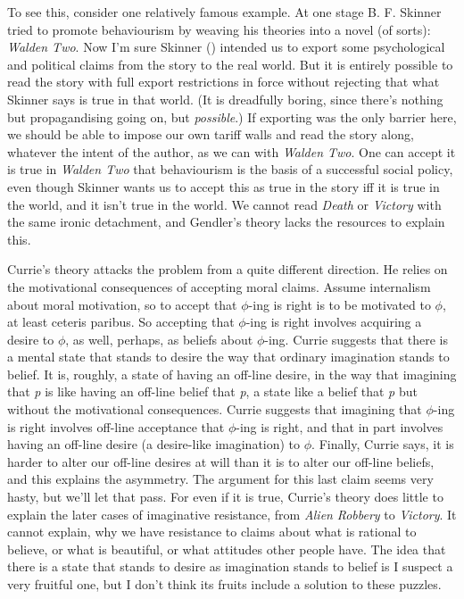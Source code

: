 \documentclass[
  10pt,
  letterpaper,
  DIV=11,
  numbers=noendperiod,
  twoside]{scrartcl}
\begin{document}
To see this, consider one relatively famous example. At one stage B. F.
Skinner tried to promote behaviourism by weaving his theories into a
novel (of sorts): \emph{Walden Two}. Now I'm sure Skinner
() intended us to export some
psychological and political claims from the story to the real world. But
it is entirely possible to read the story with full export restrictions
in force without rejecting that what Skinner says is true in that world.
(It is dreadfully boring, since there's nothing but propagandising going
on, but \emph{possible}.) If exporting was the only barrier here, we
should be able to impose our own tariff walls and read the story along,
whatever the intent of the author, as we can with \emph{Walden Two}. One
can accept it is true in \emph{Walden Two} that behaviourism is the
basis of a successful social policy, even though Skinner wants us to
accept this as true in the story iff it is true in the world, and it
isn't true in the world. We cannot read \emph{Death} or \emph{Victory}
with the same ironic detachment, and Gendler's theory lacks the
resources to explain this.

Currie's theory attacks the problem from a quite different direction. He
relies on the motivational consequences of accepting moral claims.
Assume internalism about moral motivation, so to accept that
\({\phi}\)-ing is right is to be motivated to \({\phi}\), at least
ceteris paribus. So accepting that \({\phi}\)-ing is right involves
acquiring a desire to \({\phi}\), as well, perhaps, as beliefs about
\({\phi}\)-ing. Currie suggests that there is a mental state that stands
to desire the way that ordinary imagination stands to belief. It is,
roughly, a state of having an off-line desire, in the way that imagining
that \emph{p} is like having an off-line belief that \emph{p}, a state
like a belief that \emph{p} but without the motivational consequences.
Currie suggests that imagining that \({\phi}\)-ing is right involves
off-line acceptance that \({\phi}\)-ing is right, and that in part
involves having an off-line desire (a desire-like imagination) to
\({\phi}\). Finally, Currie says, it is harder to alter our off-line
desires at will than it is to alter our off-line beliefs, and this
explains the asymmetry. The argument for this last claim seems very
hasty, but we'll let that pass. For even if it is true, Currie's theory
does little to explain the later cases of imaginative resistance, from
\emph{Alien} \emph{Robbery} to \emph{Victory}. It cannot explain, why we
have resistance to claims about what is rational to believe, or what is
beautiful, or what attitudes other people have. The idea that there is a
state that stands to desire as imagination stands to belief is I suspect
a very fruitful one, but I don't think its fruits include a solution to
these puzzles.
\end{document}

